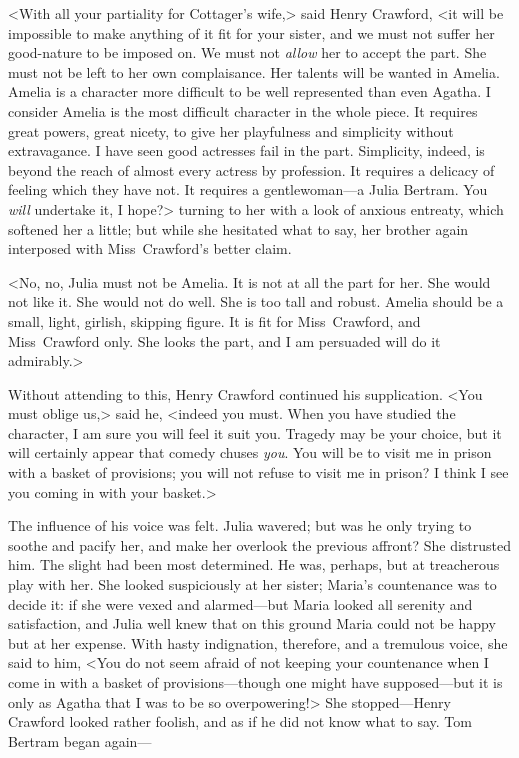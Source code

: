<With all your partiality for Cottager's wife,> said Henry Crawford, <it will be impossible to make anything of it fit for your sister, and we must not suffer her good-nature to be imposed on. We must not \textit{allow}  her to accept the part. She must not be left to her own complaisance. Her talents will be wanted in Amelia. Amelia is a character more difficult to be well represented than even Agatha. I consider Amelia is the most difficult character in the whole piece. It requires great powers, great nicety, to give her playfulness and simplicity without extravagance. I have seen good actresses fail in the part. Simplicity, indeed, is beyond the reach of almost every actress by profession. It requires a delicacy of feeling which they have not. It requires a gentlewoman—a Julia Bertram. You \textit{will}  undertake it, I hope?> turning to her with a look of anxious entreaty, which softened her a little; but while she hesitated what to say, her brother again interposed with Miss~Crawford's better claim.

<No, no, Julia must not be Amelia. It is not at all the part for her. She would not like it. She would not do well. She is too tall and robust. Amelia should be a small, light, girlish, skipping figure. It is fit for Miss~Crawford, and Miss~Crawford only. She looks the part, and I am persuaded will do it admirably.>

Without attending to this, Henry Crawford continued his supplication. <You must oblige us,> said he, <indeed you must. When you have studied the character, I am sure you will feel it suit you. Tragedy may be your choice, but it will certainly appear that comedy chuses \textit{you}. You will be to visit me in prison with a basket of provisions; you will not refuse to visit me in prison? I think I see you coming in with your basket.>

The influence of his voice was felt. Julia wavered; but was he only trying to soothe and pacify her, and make her overlook the previous affront? She distrusted him. The slight had been most determined. He was, perhaps, but at treacherous play with her. She looked suspiciously at her sister; Maria's countenance was to decide it: if she were vexed and alarmed—but Maria looked all serenity and satisfaction, and Julia well knew that on this ground Maria could not be happy but at her expense. With hasty indignation, therefore, and a tremulous voice, she said to him, <You do not seem afraid of not keeping your countenance when I come in with a basket of provisions—though one might have supposed—but it is only as Agatha that I was to be so overpowering!> She stopped—Henry Crawford looked rather foolish, and as if he did not know what to say. Tom Bertram began again—


